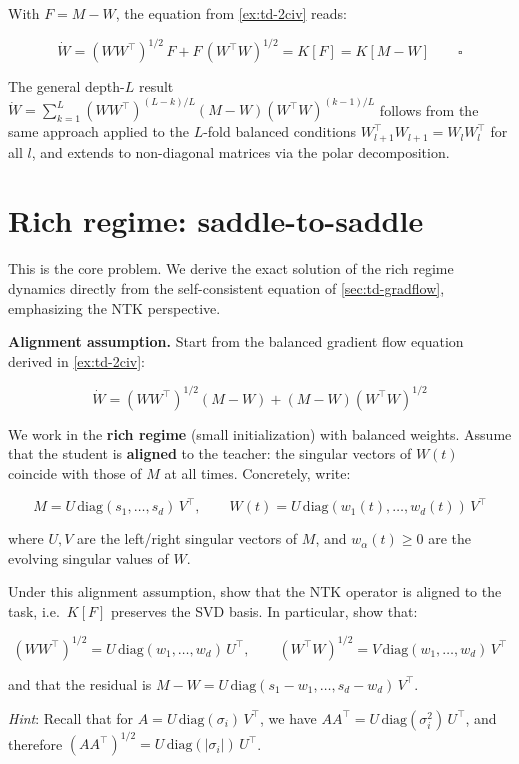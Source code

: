 \documentclass[11pt]{article}
\begin{document}
\begin{solution}[ex:td-2d]
With \(F = M - W\), the equation from \cref{ex:td-2civ} reads:

\[\dot{W} = (WW^\top)^{1/2}\,F + F\,(W^\top W)^{1/2} = K[F] = K[M - W] \qquad \square\]

The general depth-\(L\) result
\(\dot{W} = \sum_{k=1}^{L}(WW^\top)^{(L-k)/L}(M-W)(W^\top W)^{(k-1)/L}\)
follows from the same approach applied to the \(L\)-fold balanced
conditions \(W_{l+1}^\top W_{l+1} = W_l W_l^\top\) for all \(l\), and
extends to non-diagonal matrices via the polar decomposition.
\end{solution}

\section{Rich regime: saddle-to-saddle}
\label{sec:td-rich}

This is the core problem. We derive the exact solution of the rich
regime dynamics directly from the self-consistent equation of \cref{sec:td-gradflow},
emphasizing the NTK perspective.

\textbf{Alignment assumption.} Start from the balanced
gradient flow equation derived in \cref{ex:td-2civ}:

\[\dot{W} = (WW^\top)^{1/2}(M - W) + (M - W)(W^\top W)^{1/2}\]

We work in the \textbf{rich regime} (small initialization) with balanced
weights. Assume that the student is \textbf{aligned} to the teacher: the
singular vectors of \(W(t)\) coincide with those of \(M\) at all times.
Concretely, write:

\[M = U\,\text{diag}(s_1, \ldots, s_d)\,V^\top, \qquad W(t) = U\,\text{diag}(w_1(t), \ldots, w_d(t))\,V^\top\]

where \(U, V\) are the left/right singular vectors of \(M\), and
\(w_\alpha(t) \geq 0\) are the evolving singular values of \(W\).

\begin{exercise}
\label{ex:td-3ai}
Under this alignment assumption, show that the NTK
operator is aligned to the task, i.e.~\(K[F]\) preserves the SVD basis.
In particular, show that:

\[(WW^\top)^{1/2} = U\,\text{diag}(w_1, \ldots, w_d)\,U^\top, \qquad (W^\top W)^{1/2} = V\,\text{diag}(w_1, \ldots, w_d)\,V^\top\]

and that the residual is
\(M - W = U\,\text{diag}(s_1 - w_1, \ldots, s_d - w_d)\,V^\top\).

\emph{Hint}: Recall that for \(A = U\,\text{diag}(\sigma_i)\,V^\top\),
we have \(AA^\top = U\,\text{diag}(\sigma_i^2)\,U^\top\), and therefore
\((AA^\top)^{1/2} = U\,\text{diag}(|\sigma_i|)\,U^\top\).
\end{exercise}
\end{document}
